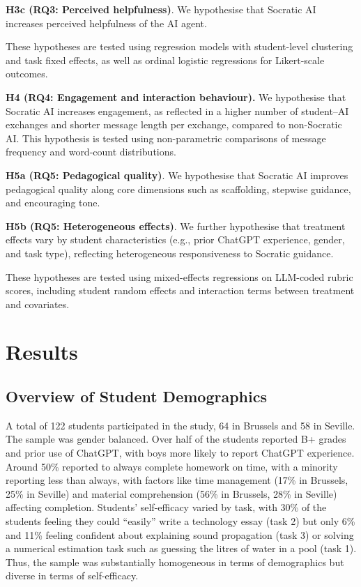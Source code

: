 \documentclass[
  11pt,
]{article}
\begin{document}
\textbf{H3c (RQ3: Perceived helpfulness)}.
We hypothesise that Socratic AI increases perceived helpfulness of the AI agent.

These hypotheses are tested using regression models with student-level clustering and task fixed effects, as well as ordinal logistic regressions for Likert-scale outcomes.

\textbf{H4 (RQ4: Engagement and interaction behaviour).}
We hypothesise that Socratic AI increases engagement, as reflected in a higher number of student--AI exchanges and shorter message length per exchange, compared to non-Socratic AI. This hypothesis is tested using non-parametric comparisons of message frequency and word-count distributions.

\textbf{H5a (RQ5: Pedagogical quality)}.
We hypothesise that Socratic AI improves pedagogical quality along core dimensions such as scaffolding, stepwise guidance, and encouraging tone.

\textbf{H5b (RQ5: Heterogeneous effects)}. We further hypothesise that treatment effects vary by student characteristics (e.g., prior ChatGPT experience, gender, and task type), reflecting heterogeneous responsiveness to Socratic guidance.

These hypotheses are tested using mixed-effects regressions on LLM-coded rubric scores, including student random effects and interaction terms between treatment and covariates.

\section{Results}\label{sec:results}

\subsection{Overview of Student Demographics}\label{overview-of-student-demographics}

A total of 122 students participated in the study, 64 in Brussels and 58 in Seville. The sample was gender balanced. Over half of the students reported B+ grades and prior use of ChatGPT, with boys more likely to report ChatGPT experience. Around 50\% reported to always complete homework on time, with a minority reporting less than always, with factors like time management (17\% in Brussels, 25\% in Seville) and material comprehension (56\% in Brussels, 28\% in Seville) affecting completion. Students' self-efficacy varied by task, with 30\% of the students feeling they could ``easily'' write a technology essay (task 2) but only 6\% and 11\% feeling confident about explaining sound propagation (task 3) or solving a numerical estimation task such as guessing the litres of water in a pool (task 1). Thus, the sample was substantially homogeneous in terms of demographics but diverse in terms of self-efficacy.
\end{document}
